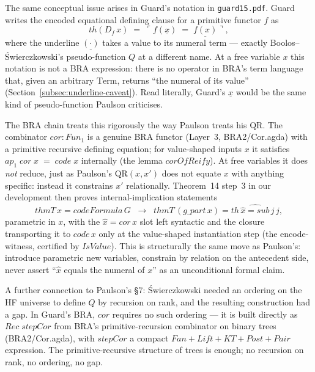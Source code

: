 \documentclass[11pt]{article}
\begin{document}
The same conceptual issue arises in Guard's notation in
\verb|guard15.pdf|.  Guard writes the encoded equational defining
clause for a primitive functor $f$ as
\[
  \mathit{th}(D_f\,x) \;=\; \ulcorner f(\underline{x}) \;=\; \underline{f(x)}\urcorner,
\]
where the underline $\underline{(\cdot)}$ takes a value to its
numeral term --- exactly Boolos--\'{S}wierczkowski's pseudo-function
$Q$ at a different name.  At a free variable $x$ this notation is
not a BRA expression: there is no operator in BRA's term language
that, given an arbitrary $\mathrm{Term}$, returns ``the numeral of
its value'' (Section~\ref{subsec:underline-caveat}).  Read
literally, Guard's $\underline{x}$ would be the same kind of
pseudo-function Paulson criticises.

The BRA chain treats this rigorously the way Paulson treats his
$\mathrm{QR}$.  The combinator $\mathit{cor} : \mathit{Fun}_1$ is a
genuine BRA functor (Layer~3, BRA2/Cor.agda) with a primitive
recursive defining equation; for value-shaped inputs $x$ it satisfies
$\mathit{ap}_1\;\mathit{cor}\;x \;=\; \mathit{code}\;x$
internally (the lemma $\mathit{corOfReify}$).  At free variables it
does \emph{not} reduce, just as Paulson's $\mathrm{QR}(x, x')$ does
not equate $x$ with anything specific: instead it constrains $x'$
relationally.  Theorem~14 step~3 in our development then proves
internal-implication statements
\[
  \mathit{thmT}\,x = \mathit{codeFormula}\,G \;\;\to\;\;
  \mathit{thmT}\,(g\_\mathit{part}\,x) = \widehat{\mathit{th}\,\hat x = \mathit{sub}\,j\,j},
\]
parametric in $x$, with the $\hat x = \mathit{cor}\,x$ slot left
syntactic and the closure transporting it to $\mathit{code}\,x$ only
at the value-shaped instantiation step (the encode-witness, certified
by $\mathit{IsValue}$).  This is structurally the same move as
Paulson's: introduce parametric new variables, constrain by relation
on the antecedent side, never assert ``$\hat x$ equals the numeral of
$x$'' as an unconditional formal claim.

A further connection to Paulson's \S7: \'{S}wierczkowski needed an
ordering on the HF universe to define $Q$ by recursion on rank, and
the resulting construction had a gap.  In Guard's BRA, $\mathit{cor}$
requires no such ordering --- it is built directly as $\mathit{Rec}\;
\mathit{stepCor}$ from BRA's primitive-recursion combinator on binary
trees (BRA2/Cor.agda), with $\mathit{stepCor}$ a compact $\mathit{Fan}
+ \mathit{Lift} + \mathit{KT} + \mathit{Post} + \mathit{Pair}$
expression.  The primitive-recursive structure of trees is enough;
no recursion on rank, no ordering, no gap.
\end{document}
